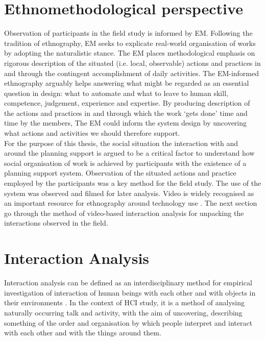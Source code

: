 \section{Ethnomethodological perspective}
Observation of participants in the field study is informed by \acf{EM}. Following the tradition of ethnography, \ac{EM} seeks to explicate real-world organisation of works by adopting the naturalistic stance. The EM places methodological emphasis on rigorous description of the situated (i.e. local, observable) actions and practices \cite{Suchman1987} in and through the contingent accomplishment of daily activities. The \ac{EM}-informed ethnography arguably helps answering what might be regarded as an essential question in design: what to automate and \cite{Crabtree2012} what to leave to human skill, competence, judgement, experience and expertise. By producing description of the actions and practices in and through which the work `gets done' time and time by the members, The EM could inform the system design by uncovering what actions and activities we should therefore support.\\

For the purpose of this thesis, the social situation the interaction with and around the planning support is argued to be a critical factor to understand how social organisation of work is achieved by participants with the existence of a planning support system. Observation of the situated actions and practice employed by the participants was a key method for the field study. The use of the system was observed and filmed for later analysis. Video is widely recognised as an important resource for ethnography around technology use \cite{Crabtree2012}. The next section go through the method of video-based interaction analysis for unpacking the interactions observed in the field. \\

\section{Interaction Analysis}
Interaction analysis can be defined as an interdisciplinary method for empirical investigation of interaction of human beings with each other and with objects in their environments \cite{Jordan1995}. In the context of \ac{HCI} study, it is a method of analysing naturally occurring talk and activity, with the aim of uncovering, describing something of the order and organisation by which people interpret and interact with each other and with the things around them.\\

